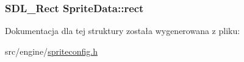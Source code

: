 \subsubsection[{rect}]{\setlength{\rightskip}{0pt plus 5cm}S\+D\+L\+\_\+\+Rect Sprite\+Data\+::rect}\label{struct_sprite_data_ad4482d398fce500b0e4a0f408a2ddd49}


Dokumentacja dla tej struktury została wygenerowana z pliku\+:\begin{DoxyCompactItemize}
\item 
src/engine/\hyperlink{spriteconfig_8h}{spriteconfig.\+h}\end{DoxyCompactItemize}
